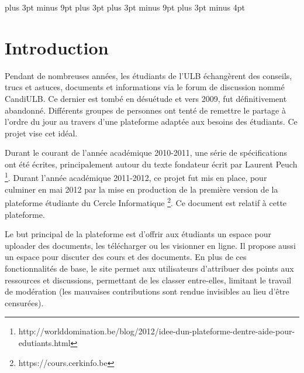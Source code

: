 \documentclass[a4paper,12pt]{article}
\begin{document}
\setlength{\footskip}{40pt}

\abovedisplayskip=9pt plus 3pt minus 9pt
\abovedisplayshortskip=6pt plus 3pt
\belowdisplayskip=9pt plus 3pt minus 9pt
\belowdisplayshortskip=9pt plus 3pt minus 4pt
\setlength{\parskip}{0.5ex plus 0.2ex minus 0.2ex}
\setlength{\parindent}{0pt}

\newpage
\setlength{\voffset}{0pt}
\setcounter{tocdepth}{2}
\tableofcontents

\newpage

\section{Introduction}

Pendant de nombreuses années, les étudiants de l'ULB échangèrent des conseils, trucs et astuces,
documents et informations via le forum de discussion nommé CandiULB. Ce dernier est tombé en désuétude et vers 2009,
fut définitivement abandonné.
Différents groupes de personnes ont tenté de remettre le partage à l'ordre du jour 
au travers d'une plateforme adaptée aux besoins des étudiants. Ce projet vise cet idéal.

Durant le courant de l'année académique 2010-2011, une série de spécifications ont été écrites,
principalement autour du texte fondateur écrit par Laurent Peuch
\footnote{http://worlddomination.be/blog/2012/idee-dun-plateforme-dentre-aide-pour-edutiants.html}.
Durant l'année académique 2011-2012, ce projet fut mis en place, pour culminer en mai 2012
par la mise en production de la première version de la plateforme étudiante du Cercle Informatique
\footnote{https://cours.cerkinfo.be}. Ce document est relatif à cette plateforme.

Le but principal de la plateforme est d'offrir aux étudiants un espace pour uploader
des documents, les télécharger ou les visionner en ligne. Il propose aussi un espace
pour discuter des cours et des documents. En plus de ces fonctionnalités de base,
le site permet aux utilisateurs d'attribuer des points aux ressources et discussions,
permettant de les classer entre-elles, limitant le travail de modération (les mauvaises
contributions sont rendue invisibles au lieu d'être censurées).
\end{document}

